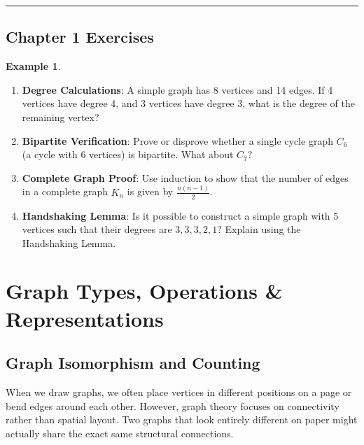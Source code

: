 \documentclass[
]{book}
\providecommand{\tightlist}{%
  \setlength{\itemsep}{0pt}\setlength{\parskip}{0pt}}
\theoremstyle{definition}
\theoremstyle{definition}
\newtheorem{example}{Example}[chapter]
\theoremstyle{definition}
\theoremstyle{definition}
\theoremstyle{remark}
\begin{document}
\begin{center}\rule{0.5\linewidth}{0.5pt}\end{center}

\section{Chapter 1 Exercises}\label{chapter-1-exercises}

\begin{example}
\protect\hypertarget{exm:unnamed-chunk-15}{}\label{exm:unnamed-chunk-15}\leavevmode

\begin{enumerate}
\def\labelenumi{\arabic{enumi}.}
\tightlist
\item
  \textbf{Degree Calculations}: A simple graph has 8 vertices and 14 edges. If 4 vertices have degree 4, and 3 vertices have degree 3, what is the degree of the remaining vertex?
\item
  \textbf{Bipartite Verification}: Prove or disprove whether a single cycle graph \(C_6\) (a cycle with 6 vertices) is bipartite. What about \(C_7\)?
\item
  \textbf{Complete Graph Proof}: Use induction to show that the number of edges in a complete graph \(K_n\) is given by \(\frac{n(n-1)}{2}\).
\item
  \textbf{Handshaking Lemma}: Is it possible to construct a simple graph with 5 vertices such that their degrees are \(3, 3, 3, 2, 1\)? Explain using the Handshaking Lemma.
\end{enumerate}

\end{example}

\chapter{Graph Types, Operations \& Representations}\label{graph-types-operations-representations}

\section{Graph Isomorphism and Counting}\label{graph-isomorphism-and-counting}

When we draw graphs, we often place vertices in different positions on a page or bend edges around each other. However, graph theory focuses on connectivity rather than spatial layout. Two graphs that look entirely different on paper might actually share the exact same structural connections.
\end{document}
